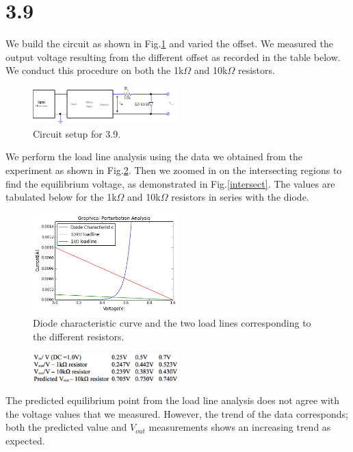 \documentclass[authoryear, 12pt,5p, times]{elsarticle}
\begin{document}
\section*{3.9}
We build the circuit as shown in Fig.\ref{3_9_setup} and varied the offset. We measured the output voltage resulting from the different offset as recorded in the table below. We conduct this procedure on both the 1k$\Omega$ and 10k$\Omega$ resistors.
\begin{figure}[h!]
\center
\includegraphics[width=0.5\textwidth]{figure/fig2}
\caption{Circuit setup for 3.9.}
\label{3_9_setup}
\end{figure}
\par We perform the load line analysis using the data we obtained from the experiment as shown in Fig.\ref{ll}. Then we zoomed in on the intersecting regions to find the equilibrium voltage, as demonstrated in Fig.\ref{intersect}. The values are tabulated below for the 1k$\Omega$ and 10k$\Omega$ resistors  in series with the diode.
\begin{figure}[h!]\label{ll}
\center
\includegraphics[width=0.5\textwidth]{figure/loadlines}
\caption{Diode characteristic curve and the two load lines corresponding to the different resistors.}
\end{figure}
\begin{figure}[h!]
\center
\includegraphics[width=0.5\textwidth]{figure/table}
\label{table}
\end{figure}
The predicted equilibrium point from the load line analysis does not agree with the voltage values that we measured. However, the trend of the data corresponds; both the predicted value and $V_{out}$ measurements shows an increasing trend as expected.
\end{document}
